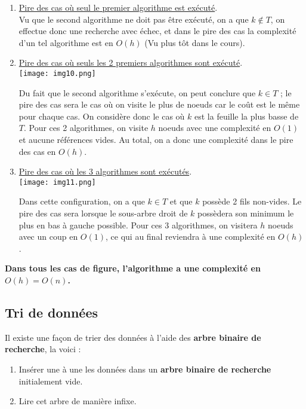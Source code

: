 \documentclass{article}
\newcommand{\abr}{\textbf{arbre binaire de recherche }}
\newcommand{\abrb}{\textbf{arbre binaire de recherche}}
\begin{document}
\begin{enumerate}
\item \underline{Pire des cas où seul le premier algorithme est exécuté}. \\
Vu que le second algorithme ne doit pas être exécuté, on a que $k\not\in T$, on effectue donc une recherche avec échec, et
dans le pire des cas la complexité d'un tel algorithme est en $O(h)$ (Vu plus tôt dans le cours). \\

\item \underline{Pire des cas où seuls les 2 premiers algorithmes sont exécuté}. \\

\texttt{[image: img10.png]}

Du fait que le second algorithme s'exécute, on peut conclure que $k\in T$ ; le pire des cas sera le cas où on visite le plus
de noeuds car le coût est le même pour chaque cas. On considère donc le cas où $k$ est la feuille la plus basse de $T$. Pour
ces 2 algorithmes, on visite $h$ noeuds avec une complexité en $O(1)$ et aucune références vides. Au total, on a donc une
complexité dans le pire des cas en $O(h)$. \\

\item \underline{Pire des cas où les 3 algorithmes sont exécutés}. \\

\texttt{[image: img11.png]}

Dans cette configuration, on a que $k\in T$ et que $k$ possède 2 fils non-vides. Le pire des cas sera lorsque le sous-arbre
droit de $k$ possèdera son minimum le plus en bas à gauche possible. Pour ces 3 algorithmes, on visitera $h$ noeuds avec un
coup en $O(1)$, ce qui au final reviendra à une complexité en $O(h)$. \\
\end{enumerate}

\noindent\textbf{Dans tous les cas de figure, l'algorithme a une complexité en $O(h) = O(n)$.}

\subsection{Tri de données}

Il existe une façon de trier des données à l'aide des \abrb, la voici : \\
\begin{enumerate}
\item Insérer une à une les données dans un \abr initialement vide.
\item Lire cet arbre de manière infixe.
\end{enumerate}
\end{document}
